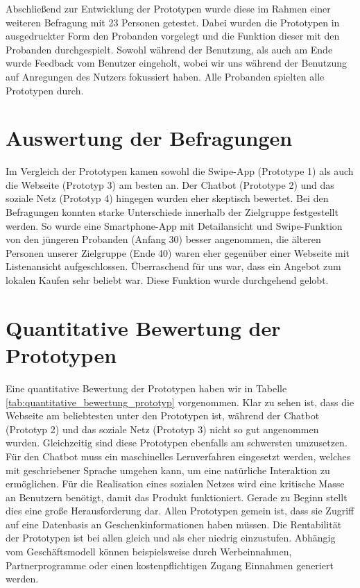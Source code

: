 \documentclass[12pt,ngerman, fleqn]{book} %
\begin{document}
Abschließend zur Entwicklung der Prototypen wurde diese im Rahmen einer weiteren Befragung mit 23 Personen getestet. Dabei wurden die Prototypen in ausgedruckter Form den Probanden vorgelegt und die Funktion dieser mit den Probanden durchgespielt. Sowohl während der Benutzung, als auch am Ende wurde Feedback vom Benutzer eingeholt, wobei wir uns während der Benutzung auf Anregungen des Nutzers fokussiert haben. Alle Probanden spielten alle Prototypen durch. \\

\section{Auswertung der Befragungen}

Im Vergleich der Prototypen kamen sowohl die Swipe-App (Prototype 1) als auch die Webseite (Prototyp 3) am besten an. Der Chatbot (Prototype 2) und das soziale Netz (Prototyp 4) hingegen wurden eher skeptisch bewertet. Bei den Befragungen konnten starke Unterschiede innerhalb der Zielgruppe festgestellt werden. So wurde eine Smartphone-App mit Detailansicht und Swipe-Funktion von den jüngeren Probanden (Anfang 30) besser angenommen, die älteren Personen unserer Zielgruppe (Ende 40) waren eher gegenüber einer Webseite mit Listenansicht aufgeschlossen. Überraschend für uns war, dass ein Angebot zum lokalen Kaufen sehr beliebt war. Diese Funktion wurde durchgehend gelobt.

\section{Quantitative Bewertung der Prototypen}

Eine quantitative Bewertung der Prototypen haben wir in Tabelle \ref{tab:quantitative_bewertung_prototyp} vorgenommen. Klar zu sehen ist, dass die Webseite am beliebtesten unter den Prototypen ist, während der Chatbot (Prototyp 2) und das soziale Netz (Prototyp 3) nicht so gut angenommen wurden. Gleichzeitig sind diese Prototypen ebenfalls am schwersten umzusetzen. Für den Chatbot muss ein maschinelles Lernverfahren eingesetzt werden, welches mit geschriebener Sprache umgehen kann, um eine natürliche Interaktion zu ermöglichen. Für die Realisation eines sozialen Netzes wird eine kritische Masse an Benutzern benötigt, damit das Produkt funktioniert. Gerade zu Beginn stellt dies eine große Herausforderung dar. Allen Prototypen gemein ist, dass sie Zugriff auf eine Datenbasis an Geschenkinformationen haben müssen. Die Rentabilität der Prototypen ist bei allen gleich und als eher niedrig einzustufen. Abhängig vom Geschäftsmodell können beispielsweise durch Werbeinnahmen, Partnerprogramme oder einen kostenpflichtigen Zugang Einnahmen generiert werden.
\end{document}

